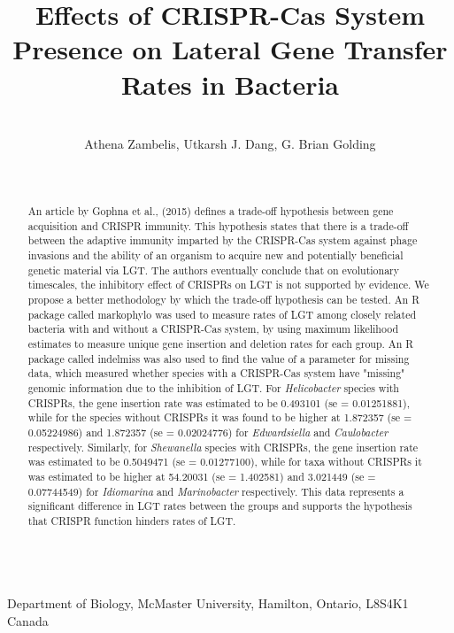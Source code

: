 \documentclass[english]{article}
\begin{document}
\title{Effects of CRISPR-Cas System Presence on Lateral Gene Transfer Rates in Bacteria}
 


\author{~\\
Athena Zambelis, Utkarsh J. Dang, G. Brian Golding
      }
      
\date{~ }

\maketitle
~\\
    Department of Biology, 
McMaster University, Hamilton, Ontario, L8S4K1 Canada 
~\\

\clearpage



\begin{abstract}
{\normalsize An article by Gophna et al., (2015) defines a trade-off
hypothesis between gene acquisition and CRISPR immunity. This
hypothesis states that there is a trade-off between the adaptive
immunity imparted by the CRISPR-Cas system against phage invasions and
the ability of an organism to acquire new and potentially beneficial
genetic material via LGT. The authors eventually conclude that on
evolutionary timescales, the inhibitory effect of CRISPRs on LGT is
not supported by evidence. We propose a better methodology by which
the trade-off hypothesis can be tested. An R package called markophylo
was used to measure rates of LGT among closely related bacteria with
and without a CRISPR-Cas system, by using maximum likelihood estimates
to measure unique gene insertion and deletion rates for each group. An
R package called indelmiss was also used to find the value of a
parameter for missing data, which measured whether species with a
CRISPR-Cas system have "missing" genomic information due to the
inhibition of LGT. For \textit{Helicobacter} species with CRISPRs, 
the gene insertion  rate was estimated to be 0.493101 (se =
0.01251881), while for the  species without CRISPRs it was found to be
higher  at  1.872357 (se = 0.05224986) and 1.872357 (se = 0.02024776)
for \textit{Edwardsiella} and \textit{Caulobacter} respectively.  
Similarly, for \textit{Shewanella} species with CRISPRs, the gene 
insertion  rate was estimated to be 0.5049471 (se = 0.01277100), 
while for taxa  without CRISPRs it was estimated to be higher 
at 54.20031 (se = 1.402581) and
3.021449 (se = 0.07744549) for \textit{Idiomarina} and
\textit{Marinobacter}
respectively. This data  represents a significant  difference in LGT
rates  between  the  groups  and  supports the hypothesis  that CRISPR
function  hinders  rates  of LGT.}
\end{abstract}
\end{document}
